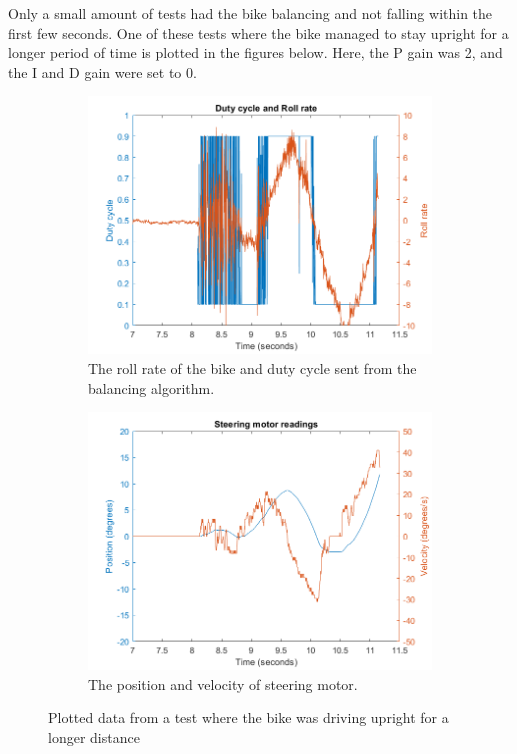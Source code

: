 Only a small amount of tests had the bike balancing and not falling within the first few seconds. One of these tests where the bike managed to stay upright for a longer period of time is plotted in the figures below. Here, the P gain was 2, and the I and D gain were set to 0.

\begin{figure}[H]
    \begin{subfigure}{.5\textwidth}
        \centering
        \includegraphics[width=\textwidth]{figure/test4_control.png}
        \caption{The roll rate of the bike and duty cycle sent from the balancing algorithm.}
        \label{fig:test4_control}
    \end{subfigure}
    \begin{subfigure}{.5\textwidth}
        \centering
        \includegraphics[width=\textwidth]{figure/test4_motor.png}
        \caption{The position and velocity of steering motor.}
        \label{fig:test4_motor}
    \end{subfigure}
\caption{Plotted data from a test where the bike was driving upright for a longer distance}
\label{fig:test4}
\end{figure}

